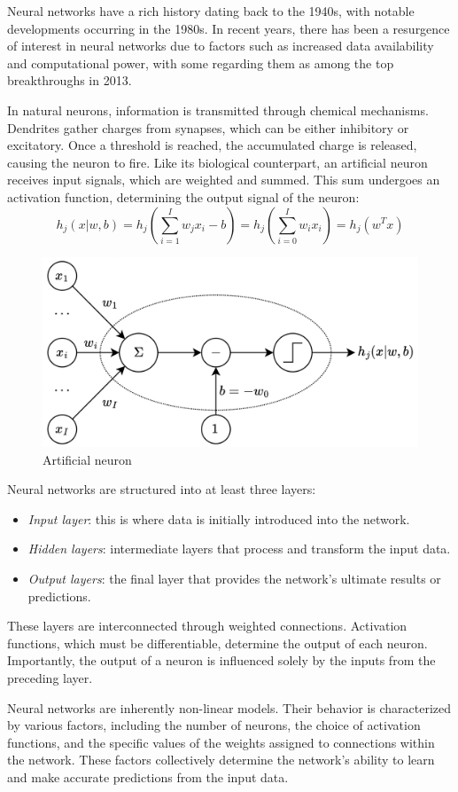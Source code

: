 Neural networks have a rich history dating back to the 1940s, with notable developments occurring in the 1980s. 
In recent years, there has been a resurgence of interest in neural networks due to factors such as increased data availability and computational power, with some regarding them as among the top breakthroughs in 2013.

In natural neurons, information is transmitted through chemical mechanisms. 
Dendrites gather charges from synapses, which can be either inhibitory or excitatory. 
Once a threshold is reached, the accumulated charge is released, causing the neuron to fire.
Like its biological counterpart, an artificial neuron receives input signals, which are weighted and summed. 
This sum undergoes an activation function, determining the output signal of the neuron: 
\[h_j(x|w,b)=h_j\left(\sum_{i=1}^{I}w_j x_i-b\right)=h_j\left( \sum_{i=0}^{I}w_i x_i \right)=h_j\left(w^T x\right)\]
\begin{figure}[H]
    \centering
    \includegraphics[width=0.5\linewidth]{images/neuron.png}
    \caption{Artificial neuron}
\end{figure}
Neural networks are structured into at least three layers:
\begin{itemize}
    \item \textit{Input layer}: this is where data is initially introduced into the network.
    \item \textit{Hidden layers}: intermediate layers that process and transform the input data.
    \item \textit{Output layers}: the final layer that provides the network's ultimate results or predictions.
\end{itemize}
These layers are interconnected through weighted connections. 
Activation functions, which must be differentiable, determine the output of each neuron. 
Importantly, the output of a neuron is influenced solely by the inputs from the preceding layer.

Neural networks are inherently non-linear models. 
Their behavior is characterized by various factors, including the number of neurons, the choice of activation functions, and the specific values of the weights assigned to connections within the network. 
These factors collectively determine the network's ability to learn and make accurate predictions from the input data.

